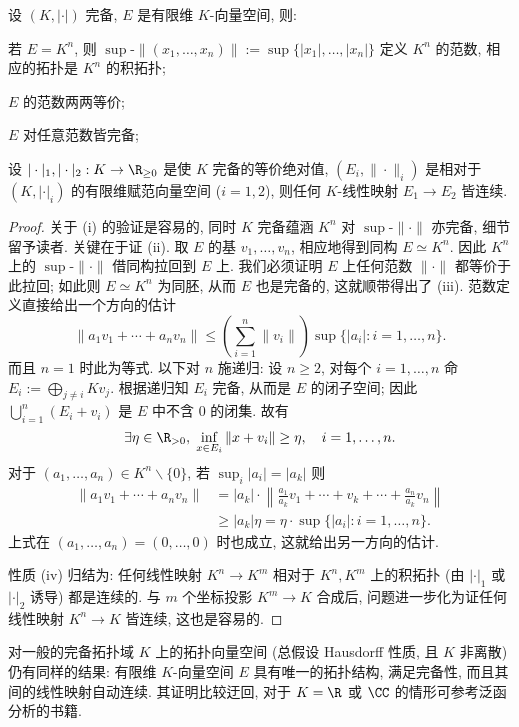\begin{proposition}\label{prop:finite-dim-norm}
	设 $(K, |\cdot|)$ 完备, $E$ 是有限维 $K$-向量空间, 则:
	\begin{compactenum}[(i)]
		\item 若 $E=K^n$, 则 $\sup\text{-}\|(x_1, \ldots, x_n)\| := \sup\{|x_1|, \ldots, |x_n|\}$ 定义 $K^n$ 的范数, 相应的拓扑是 $K^n$ 的积拓扑;
		\item $E$ 的范数两两等价;
		\item $E$ 对任意范数皆完备;
		\item 设 $|\cdot|_1, |\cdot|_2: K \to \R_{\geq 0}$ 是使 $K$ 完备的等价绝对值, $(E_i, \|\cdot\|_i)$ 是相对于 $(K, |\cdot|_i)$ 的有限维赋范向量空间 ($i=1,2$), 则任何 $K$-线性映射 $E_1 \to E_2$ 皆连续.
	\end{compactenum}
\end{proposition}
\begin{proof}
	关于 (i) 的验证是容易的, 同时 $K$ 完备蕴涵 $K^n$ 对 $\sup\text{-}\|\cdot\|$ 亦完备, 细节留予读者. 关键在于证 (ii). 取 $E$ 的基 $v_1, \ldots, v_n$, 相应地得到同构 $E \simeq K^n$. 因此 $K^n$ 上的 $\sup\text{-}\|\cdot\|$ 借同构拉回到 $E$ 上. 我们必须证明 $E$ 上任何范数 $\|\cdot\|$ 都等价于此拉回; 如此则 $E \simeq K^n$ 为同胚, 从而 $E$ 也是完备的, 这就顺带得出了 (iii). 范数定义直接给出一个方向的估计
	\[ \| a_1 v_1 + \cdots + a_n v_n \| \leq \left( \sum_{i=1}^n \|v_i\| \right) \sup\{|a_i|: i=1, \ldots, n\}. \]
	而且 $n=1$ 时此为等式. 以下对 $n$ 施递归: 设 $n \geq 2$, 对每个 $i=1, \ldots, n$ 命 $E_i := \bigoplus_{j \neq i} K v_j$. 根据递归知 $E_i$ 完备, 从而是 $E$ 的闭子空间; 因此 $\bigcup_{i=1}^n (E_i + v_i)$ 是 $E$ 中不含 $0$ 的闭集. 故有
	\[ \exists \eta \in \R_{>0}, \; \inf_{x \in E_i} \|x + v_i \| \geq \eta, \quad i=1, \ldots, n. \]
	对于 $(a_1, \ldots, a_n) \in K^n \smallsetminus \{0\}$, 若 $\sup_i |a_i| = |a_k|$ 则
	\begin{align*}
		\| a_1 v_1 + \cdots + a_n v_n \| & = |a_k| \cdot \left\| \frac{a_1}{a_k} v_1 + \cdots + v_k + \cdots + \frac{a_n}{a_k} v_n \right\| \\
		& \geq |a_k| \eta = \eta \cdot \sup\{|a_i|: i=1, \ldots, n \}.
	\end{align*}
	上式在 $(a_1, \ldots, a_n)=(0, \ldots, 0)$ 时也成立, 这就给出另一方向的估计.

	性质 (iv) 归结为: 任何线性映射 $K^n \to K^m$ 相对于 $K^n, K^m$ 上的积拓扑 (由 $|\cdot|_1$ 或 $|\cdot|_2$ 诱导) 都是连续的. 与 $m$ 个坐标投影 $K^m \to K$ 合成后, 问题进一步化为证任何线性映射 $K^n \to K$ 皆连续, 这也是容易的.
\end{proof}
\begin{remark}
	对一般的完备拓扑域 $K$ 上的拓扑向量空间 (总假设 Hausdorff 性质, 且 $K$ 非离散) 仍有同样的结果: 有限维 $K$-向量空间 $E$ 具有唯一的拓扑结构, 满足完备性, 而且其间的线性映射自动连续. 其证明比较迂回, 对于 $K=\R$ 或 $\CC$ 的情形可参考泛函分析的书籍.
\end{remark}

